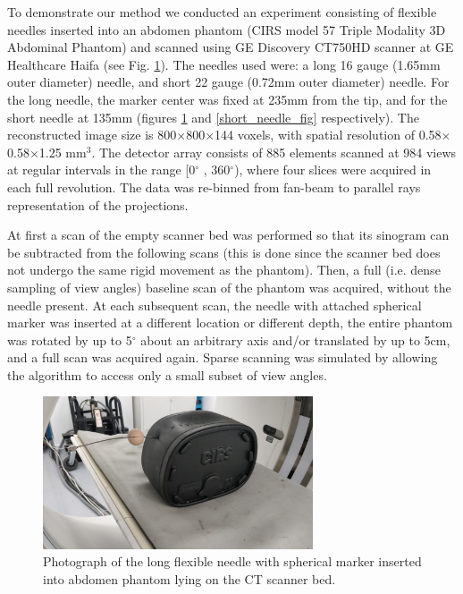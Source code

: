 \documentclass[letterpaper, 11 pt, conference]{ieeeconf} %
\begin{document}
To demonstrate our method we conducted an experiment consisting of flexible needles inserted into an abdomen phantom (CIRS model 57 Triple Modality 3D Abdominal Phantom) and scanned using GE Discovery CT750HD scanner at GE Healthcare Haifa (see Fig. \ref{long_needle_fig}). The needles used were: a long 16 gauge (1.65mm outer diameter) needle, and short 22 gauge (0.72mm outer diameter) needle. For the long needle, the marker center was fixed at 235mm from the tip, and for the short needle at 135mm (figures \ref{long_needle_fig} and \ref{short_needle_fig} respectively).
The reconstructed image size is 800$\times$800$\times$144 voxels, with spatial resolution of 0.58$\times$0.58$\times$1.25 mm$^3$. The detector array consists of 885 elements scanned at 984 views at regular intervals in the range [0$^{\circ}$ , 360$^{\circ}$), where four slices were acquired in each full revolution. The data was re-binned from fan-beam to parallel rays representation of the projections.

At first a scan of the empty scanner bed was performed so that its sinogram can be subtracted from the following scans (this is done since the scanner bed does not undergo the same rigid movement as the phantom). Then, a full (i.e. dense sampling of view angles) baseline scan of the phantom was acquired, without the needle present. At each subsequent scan, the needle with attached spherical marker was inserted at a different location or different depth, the entire phantom was rotated by up to 5$^\circ$ about an arbitrary axis and/or translated by up to 5cm, and a full scan was acquired again. Sparse scanning was simulated by allowing the algorithm to access only a small subset of view angles.


\begin{figure}[b]
\centering
\includegraphics[width=8cm]{long_needle_phantom.jpg}
\caption{\small{Photograph of the long flexible needle with spherical marker inserted into abdomen phantom lying on the CT scanner bed.}}
\label{long_needle_fig}
\end{figure}
\end{document}
